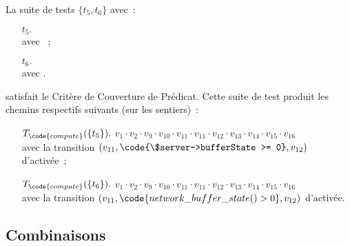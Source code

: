 \begin{example}

La suite de tests $\{t_5, t_6\}$ avec~:
%
\begin{itemize}

\item[$t_5.$]  \\
avec ~;

\item[$t_6.$]  \\
avec .

\end{itemize}
%
satisfait le Critère de Couverture de Prédicat. Cette suite de test produit les
chemins respectifs suivants (sur les sentiers)~:
%
\begin{itemize}

\item[$T_\code{compute}(\{t_5\}).$]
%
$v_1 \cdot v_2 \cdot v_9 \cdot v_{10} \cdot v_{11} \cdot v_{11} \cdot v_{12}
\cdot v_{13} \cdot v_{14} \cdot v_{15} \cdot v_{16}$ \\
avec la transition $(v_{11}, \code{\$server->bufferState >= 0}, v_{12})$
d'activée~;

\item[$T_\code{compute}(\{t_6\}).$]
%
$v_1 \cdot v_2 \cdot v_9 \cdot v_{10} \cdot v_{11} \cdot v_{11} \cdot v_{12}
\cdot v_{13} \cdot v_{14} \cdot v_{15} \cdot v_{16}$ \\
avec la transition $(v_{11}, \code{network\_buffer\_state() > 0}, v_{12})$
d'activée.

\end{itemize}

\end{example}

\subsection{Combinaisons}
\label{subsection:test:combination}

